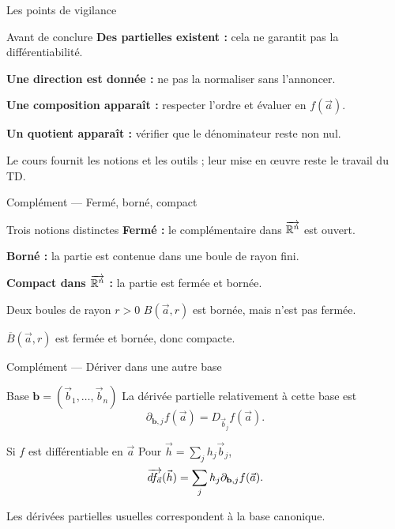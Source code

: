 \begin{frame}[t]{Les points de vigilance}
\coursanalyse
\begin{cours}{Avant de conclure}
\textbf{Des partielles existent :} cela ne garantit pas la différentiabilité.

\medskip
\textbf{Une direction est donnée :} ne pas la normaliser sans l'annoncer.

\medskip
\textbf{Une composition apparaît :} respecter l'ordre et évaluer en $f(\vec a)$.

\medskip
\textbf{Un quotient apparaît :} vérifier que le dénominateur reste non nul.
\end{cours}
\vfill Le cours fournit les notions et les outils ; leur mise en œuvre reste le travail du TD.
\end{frame}

\begin{frame}[t]{Complément — Fermé, borné, compact}
\coursanalyse
\begin{notion}{Trois notions distinctes}
\textbf{Fermé :} le complémentaire dans $\overrightarrow{\mathbb R^{n}}$ est ouvert.

\medskip
\textbf{Borné :} la partie est contenue dans une boule de rayon fini.

\medskip
\textbf{Compact dans $\overrightarrow{\mathbb R^{n}}$ :} la partie est fermée et bornée.
\end{notion}
\begin{exemple}{Deux boules de rayon $r>0$}
$B(\vec a,r)$ est bornée, mais n'est pas fermée.

$\overline B(\vec a,r)$ est fermée et bornée, donc compacte.
\end{exemple}
\end{frame}

\begin{frame}[t]{Complément — Dériver dans une autre base}
\coursanalyse
\begin{notion}{Base $\mathbf b=(\vec b_1,\ldots,\vec b_n)$}
La dérivée partielle relativement à cette base est
\[\partial_{\mathbf b,j}f(\vec a)=D_{\vec b_j}f(\vec a).\]
\end{notion}
\begin{theoreme}{Si $f$ est différentiable en $\vec a$}
Pour $\vec h=\sum_j h_j\vec b_j$,
\[\overrightarrow{df_{\vec a}}(\vec h)=\sum_j h_j\partial_{\mathbf b,j}f(\vec a).\]
\end{theoreme}
\vfill Les dérivées partielles usuelles correspondent à la base canonique.
\end{frame}

